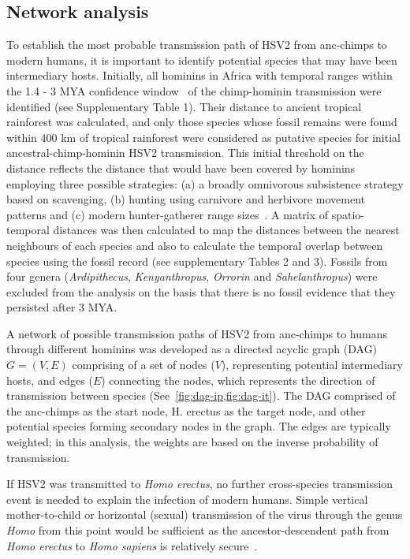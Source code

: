 \documentclass[fleqn,10pt]{wlscirep}
\begin{document}
\subsection*{Network analysis}
To establish the most probable transmission path of HSV2 from anc-chimps to modern humans, it is important to identify potential species that may have been intermediary hosts. Initially, all hominins in Africa with temporal ranges within the 1.4 - 3 MYA confidence window~\citep{Wertheim2014} of the chimp-hominin transmission were identified (see Supplementary Table 1). Their distance to ancient tropical rainforest was calculated, and only those species whose fossil remains were found within 400 km of tropical rainforest were considered as putative species for initial ancestral-chimp-hominin HSV2 transmission. This initial threshold on the distance reflects the distance that would have been covered by hominins employing three possible strategies: (a) a broadly omnivorous subsistence strategy based on scavenging, (b) hunting using carnivore and herbivore movement patterns and (c) modern hunter-gatherer range sizes~\citep{Foley1978,Grant1992}. A matrix of spatio-temporal distances was then calculated to map the distances between the nearest neighbours of each species and also to calculate the temporal overlap between species using the fossil record (see supplementary Tables 2 and 3). Fossils from four genera (\textit{Ardipithecus}, \textit{Kenyanthropus}, \textit{Orrorin} and \textit{Sahelanthropus}) were excluded from the analysis on the basis that there is no fossil evidence that they persisted after 3 MYA.

A  network of possible transmission paths of HSV2 from anc-chimps to humans through different hominins was developed as a directed acyclic graph (DAG) $G = (V, E)$ comprising of a set of nodes ($V$), representing potential intermediary hosts, and edges ($E$) connecting the nodes, which represents the direction of transmission between species (See~\cref{fig:dag-ip,fig:dag-it}). The DAG comprised of the anc-chimps as the start node, H. erectus as the target node, and other potential species forming secondary nodes in the graph. The edges are typically weighted; in this analysis, the weights are based on the inverse probability of transmission.

If HSV2 was transmitted to \textit{Homo erectus}, no further cross-species transmission event is needed to explain the infection of modern humans. Simple vertical mother-to-child or horizontal (sexual) transmission of the virus through the genus \textit{Homo} from this point would be sufficient as the ancestor-descendent path from \textit{Homo erectus} to \textit{Homo sapiens} is relatively secure~\citep{Maslin2015}.
\end{document}
